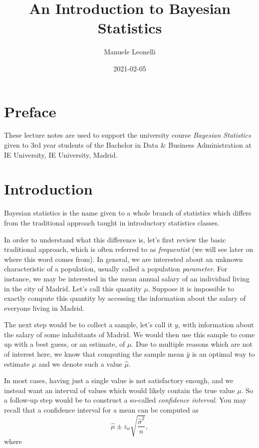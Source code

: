 \documentclass[
]{book}
\title{An Introduction to Bayesian Statistics}
\author{Manuele Leonelli}
\date{2021-02-05}
\begin{document}
\maketitle

{
\setcounter{tocdepth}{1}
\tableofcontents
}
\hypertarget{preface}{%
\chapter*{Preface}\label{preface}}

These lecture notes are used to support the university course \emph{Bayesian Statistics} given to 3rd year students of the Bachelor in Data \& Business Administration at IE University, IE University, Madrid.

\hypertarget{intro}{%
\chapter{Introduction}\label{intro}}

Bayesian statistics is the name given to a whole branch of statistics which differs from the traditional approach taught in introductory statistics classes.

In order to understand what this difference is, let's first review the basic traditional approach, which is often referred to as \emph{frequentist} (we will see later on where this word comes from). In general, we are interested about an unknown characteristic of a population, usually called a population \emph{parameter}. For instance, we may be interested in the mean annual salary of an individual living in the city of Madrid. Let's call this quantity \(\mu\). Suppose it is impossible to exactly compute this quantity by accessing the information about the salary of everyone living in Madrid.

The next step would be to collect a sample, let's call it \(y\), with information about the salary of some inhabitants of Madrid. We would then use this sample to come up with a best guess, or an estimate, of \(\mu\). Due to multiple reasons which are not of interest here, we know that computing the sample mean \(\bar{y}\) is an optimal way to estimate \(\mu\) and we denote such a value \(\hat{\mu}\).

In most cases, having just a single value is not satisfactory enough, and we instead want an interval of values which would likely contain the true value \(\mu\). So a follow-up step would be to construct a so-called \emph{confidence interval}. You may recall that a confidence interval for a mean can be computed as
\[
\hat{\mu}\pm z_{\alpha}\sqrt{\frac{\hat{\sigma}^2}{n}},
\]
where
\end{document}
